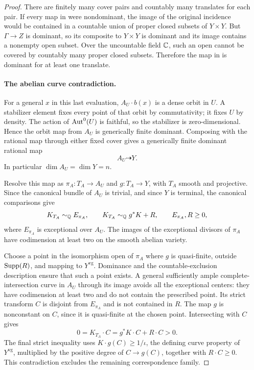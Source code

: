 \begin{proof}
There are finitely many cover pairs and countably many translates
for each pair. If every map in 
were nondominant, the image of the original incidence would be
contained in a countable union of proper closed subsets of
\(Y\times Y\). But \(\Gamma\to Z\) is dominant, so its composite
to \(Y\times Y\) is dominant and its image contains a nonempty
open subset. Over the uncountable field \(\mathbb C\), such an open
cannot be covered by countably many proper closed subsets.
Therefore the map in  is dominant for at
least one translate.

\paragraph{The abelian curve contradiction.}
For a general \(x\) in this last evaluation, \(A_U\cdot b(x)\)
is a dense orbit in \(U\). A stabilizer element fixes every point
of that orbit by commutativity; it fixes \(U\) by density.
The action of \(\operatorname{Aut}^0(U)\) is faithful, so the stabilizer is
zero-dimensional. Hence the orbit map from \(A_U\) is generically
finite dominant. Composing with the rational map through either
fixed cover gives a generically finite dominant rational map
\[
 A_U\dashrightarrow Y .
\]
In particular \(\dim A_U=\dim Y=n\).

Resolve this map as
\(\pi_A:T_A\to A_U\) and \(g:T_A\to Y\), with \(T_A\) smooth and
projective. Since the canonical bundle of \(A_U\) is trivial,
and since \(Y\) is terminal, the canonical comparisons give
\begin{equation}\label{eq:abelian-canonical-comparisons}
 K_{T_A}\sim_{\mathbb Q}E_{\pi_A},\qquad
 K_{T_A}\sim_{\mathbb Q}g^*K+R,\qquad
 E_{\pi_A},R\ge0 ,
\end{equation}
where \(E_{\pi_A}\) is exceptional over \(A_U\).
The images of the exceptional divisors of \(\pi_A\) have
codimension at least two on the smooth abelian variety.

Choose a point in the isomorphism open of \(\pi_A\) where \(g\)
is quasi-finite, outside \(\operatorname{Supp}(R)\), and mapping to
\(Y^{\mathrm{vg}}\). Dominance and the countable-exclusion
description ensure that such a point exists. A general sufficiently
ample complete-intersection curve in \(A_U\) through its image
avoids all the exceptional centers: they have codimension at
least two and do not contain the prescribed point. Its strict
transform \(C\) is disjoint from \(E_{\pi_A}\) and is not contained
in \(R\). The map \(g\) is nonconstant on \(C\), since it is
quasi-finite at the chosen point. Intersecting
 with \(C\) gives
\[
 0=K_{T_A}\cdot C=g^*K\cdot C+R\cdot C>0 .
\]
The final strict inequality uses
\(K\cdot g(C)\ge1/\iota\), the defining curve property of
\(Y^{\mathrm{vg}}\), multiplied by the positive degree of
\(C\to g(C)\), together with \(R\cdot C\ge0\).
This contradiction excludes the remaining correspondence family.
\end{proof}

